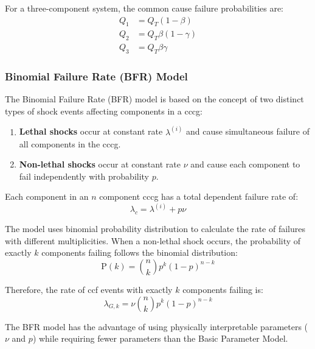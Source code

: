 For a three-component system, the common cause failure probabilities are:
\[
\begin{aligned}
Q_1 &= Q_T(1-\beta) \\
Q_2 &= Q_T\beta(1-\gamma) \\
Q_3 &= Q_T\beta\gamma
\end{aligned}
\]

\subsubsection{Binomial Failure Rate (BFR) Model}

The Binomial Failure Rate (BFR) model is based on the concept of two distinct types of shock events affecting components in a \acrshort{cccg}:

\begin{enumerate}
  \item \textbf{Lethal shocks} occur at constant rate $\lambda^{(i)}$ and cause simultaneous failure of all components in the \acrshort{cccg}.
  
  \item \textbf{Non-lethal shocks} occur at constant rate $\nu$ and cause each component to fail independently with probability $p$.
\end{enumerate}

Each component in an $n$ component \acrshort{cccg} has a total dependent failure rate of:
\begin{equation}
\lambda_c = \lambda^{(i)} + p\nu
\end{equation}

The model uses binomial probability distribution to calculate the rate of failures with different multiplicities. When a non-lethal shock occurs, the probability of exactly $k$ components failing follows the binomial distribution:
\begin{equation}
\text{P}(k) = \binom{n}{k}p^k(1-p)^{n-k}
\end{equation}

Therefore, the rate of \acrshort{ccf} events with exactly $k$ components failing is:
\begin{equation}
\lambda_{G,k} = \nu\binom{n}{k}p^k(1-p)^{n-k}
\end{equation}

The BFR model has the advantage of using physically interpretable parameters ($\nu$ and $p$) while requiring fewer parameters than the Basic Parameter Model.

